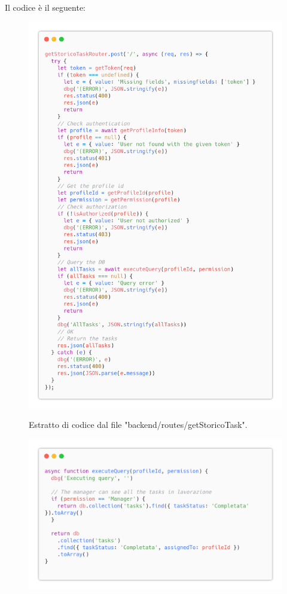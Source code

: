 \documentclass{report}
\begin{document}
Il codice è il seguente:
\begin{figure}[H]
	\centering\includegraphics[width=1\textwidth]{images/code_storico.png}
	
	Estratto di codice dal file "backend/routes/getStoricoTask".
\end{figure}
\begin{figure}[H]
	\centering\includegraphics[width=1\textwidth]{images/code_storico2.png}
\end{figure}
\end{document}
